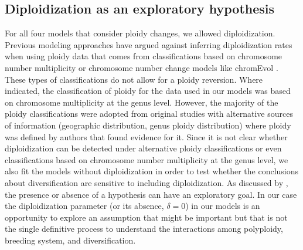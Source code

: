 \subsection{Diploidization as an exploratory hypothesis}

For all four models that consider ploidy changes, we allowed diploidization.
Previous modeling approaches \citep{mayrose_2011} have argued against inferring diploidization rates when using ploidy data that comes from classifications based on chromosome number multiplicity or chromosome number change models like chromEvol \citep{mayrose_2010}.
These types of classifications do not allow for a ploidy reversion.
Where indicated, the classification of ploidy for the data used in our models was based on chromosome multiplicity at the genus level.
However, the majority of the ploidy classifications were adopted from original studies with alternative sources of information (\eg geographic distribution, genus ploidy distribution) where ploidy was defined by authors that found evidence for it.
Since it is not clear whether diploidization can be detected under alternative ploidy classifications or even classifications based on chromosome number multiplicity at the genus level, we also fit the models without diploidization in order to test  whether the conclusions about diversification are sensitive to including diploidization.
As discussed by \citet{servedio_2014}, the presence or absence of a hypothesis can have an exploratory goal.
In our case the diploidization parameter (or its absence, $\delta=0$) in our models is an opportunity to explore an assumption that might be important but that is not the single definitive process to understand the interactions among polyploidy, breeding system, and diversification.


